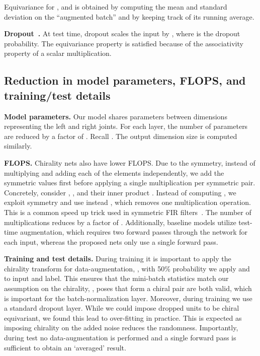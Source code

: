 \documentclass{article}
\begin{document}
Equivariance for , and  is obtained by
computing the mean and standard deviation on the ``augmented batch'' and by keeping track of its running average. 

\textbf{Dropout~\cite{srivastava2014dropout}.}
At test time, dropout scales the input by , where  is the dropout probability. The equivariance property is satisfied because of  the associativity property of a scalar multiplication. 

\subsection{Reduction in model parameters, FLOPS, and training/test details}
\textbf{Model parameters.} Our model shares parameters between dimensions representing the left and right joints. For each layer, the number of parameters are reduced by a factor of 
. Recall . The output dimension size is computed similarly.

\textbf{FLOPS.} Chirality nets  also have lower FLOPS.  Due to the symmetry, instead of multiplying and adding each of the elements independently, we  add the symmetric values first before applying a single multiplication per symmetric pair. 
{
Concretely, consider , , and their inner product . Instead of  computing , we exploit symmetry and use instead  , which removes one multiplication operation. 
}
This is a common speed up trick used in symmetric FIR filters~\cite{note1998implementing, yeh2016stable}. The number of multiplications reduces by a factor of . Additionally, baseline models utilize test-time augmentation, which requires two forward passes through the network for each input, whereas the proposed nets only use a single forward pass. 

\textbf{Training and test details.}  
During training it is important to apply the chirality transform for data-augmentation, \ie, with 50\% probability we apply  and  to  input and label. This  ensures that the mini-batch statistics match our assumption on the chirality, \ie, poses that form a chiral pair are both valid, which is important for the batch-normalization layer. 
Moreover, during training we use a standard dropout layer. While we could impose  dropped units to be chiral equivariant, we found this lead to over-fitting in practice. This is expected as imposing chirality on the added noise reduces the randomness. 
Importantly, during test no data-augmentation is performed and a single forward pass is sufficient to obtain an `averaged' result. 
\end{document}
